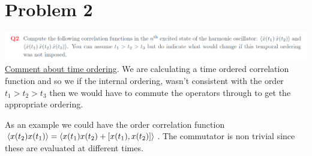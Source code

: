 \documentclass[a4paper,11pt]{article}
\begin{document}
\section*{Problem 2}
\hspace*{-1cm}\includegraphics[width=0.85\pagewidth]{2.png}
\underline{Comment about time ordering}. We are calculating a time ordered correlation function and so we if the internal ordering, wasn't consistent with the order $t_1>t_2>t_3$ then we would have to commute the operators through to get the appropriate ordering. 

As an example we could have the order correlation function $\expval{x(t_2)x(t_1)}=\expval{x(t_1)x(t_2)+[x(t_1),x(t_2)]}$. The commutator is non trivial since these are evaluated at different times.
\end{document}
